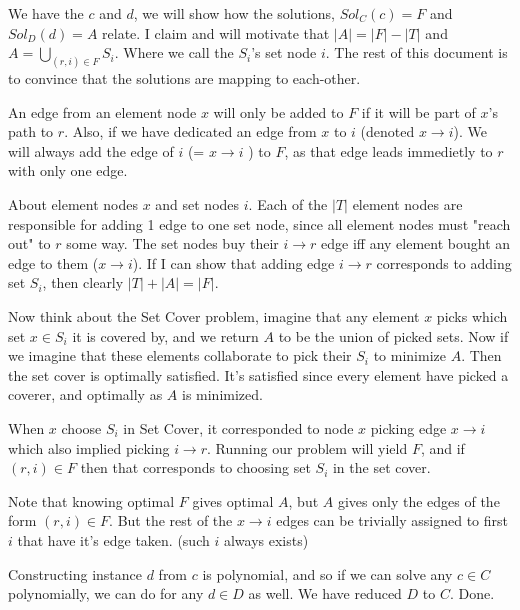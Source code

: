 \documentclass[a4paper,11pt]{article}
\begin{document}
We have the $c$ and $d$, we will show how the solutions,
$Sol_C(c) = F$ and $Sol_D(d) = A$ relate.
I claim and will motivate that $ |A| = |F| - |T| $ and
$ A = \bigcup_{(r,i) \in F} S_i$. Where we call the $S_i$'s set node
$i$. The rest of this document is to
convince that the solutions
are mapping to each-other.

An edge from an element node $x$ will only be added
to $F$ if it will be part of $x$'s path to $r$. 
Also, if we have dedicated an edge from $x$ to $i$ (denoted $x \to i$).
We will always add the edge of $i$ (= $x \to i$ ) to $F$,
as that edge leads immedietly to $r$ with only one edge.

About element nodes $x$ and set nodes $i$. Each of the $|T|$
element nodes are
responsible for adding 1 edge to one set node, since all element
nodes must "reach out" to $r$ some way.
The set nodes buy their $i \to r$ edge iff any element
bought an edge to them ($x \to i$). If I can show
that adding edge $i \to r$ corresponds to adding set $S_i$,
then clearly $|T| + |A| = |F|$.

Now think about the Set Cover problem, imagine
that any element $x$
picks which set $x \in S_i$ it is covered by, and we return
$A$ to be the union of picked sets. Now if we
imagine that these elements collaborate to pick their $S_i$
to minimize $A$. Then the set cover is optimally satisfied.
It's satisfied since every element have picked
a coverer, and optimally as $A$ is minimized.

When $x$ choose $S_i$ in Set Cover, it corresponded to
node $x$ picking edge $x \to i$ which also implied
picking $i \to r$. Running our problem will yield
$F$, and if $(r,i) \in F$ then that corresponds to
choosing set $S_i$ in the set cover.

Note that knowing optimal $F$ gives optimal $A$,
but $A$ gives only the edges of the form $(r, i) \in F$.
But the rest of the $x \to i$ edges can be trivially
assigned to first $i$ that have it's edge taken.
(such $i$ always exists)

Constructing instance $d$ from $c$ is polynomial,
and so if we can solve any $c \in C$ polynomially, we can do
for any $d \in D$ as well. We have reduced $D$ to $C$. Done.
\end{document}
